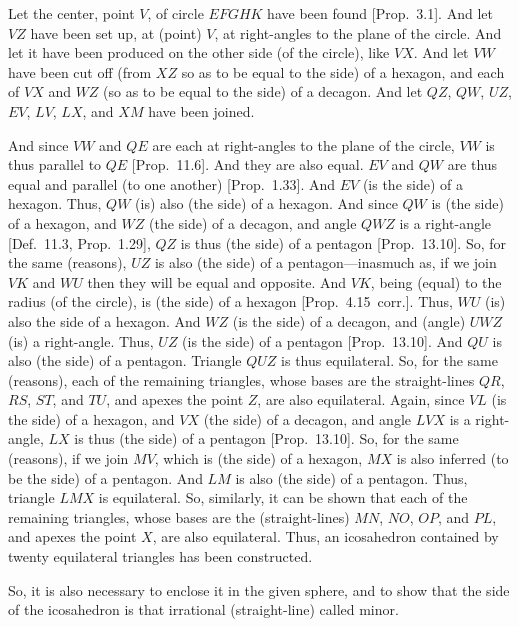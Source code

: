 \epsfysize=3.5in
\centerline{}

Let the center, point $V$, of circle $EFGHK$ have been found [Prop.~3.1]. 
And let $VZ$ have been set up, at (point) $V$,  at right-angles to the plane of the
circle. And let it have been produced on the other side (of the circle), 
like $VX$. And let $VW$ have been cut off 
(from $XZ$ so as to be equal to the side) of a hexagon, and each of $VX$ and 
$WZ$ (so as to be equal to the side) of a decagon. And let
$QZ$,  $QW$, $UZ$, $EV$, $LV$, $LX$, and
$XM$ have been joined.

And since $VW$ and $QE$ are each at right-angles to the plane of the
circle, $VW$ is thus parallel to $QE$ [Prop.~11.6].  And they are also
equal. $EV$ and $QW$ are thus equal and parallel (to one another) [Prop.~1.33]. And $EV$ (is the side) of a hexagon. Thus, $QW$
(is) also (the side) of a hexagon. And since $QW$ is (the side) of a hexagon, 
and $WZ$ (the side) of a decagon, and angle $QWZ$ is a right-angle
[Def.~11.3, Prop.~1.29], 
$QZ$ is thus (the side) of a pentagon [Prop.~13.10]. So, for the same
(reasons), $UZ$ is also (the side) of a pentagon---inasmuch as, if we join
$VK$ and $WU$ then they will be equal and opposite. 
And $VK$, being (equal)
to the radius (of the circle), is (the side) of a hexagon [Prop.~4.15~corr.].
Thus, $WU$ (is) also the side of a hexagon.
 And $WZ$
(is the side) of a decagon, and (angle) $UWZ$ (is) a right-angle. 
Thus, $UZ$ (is the side) of a pentagon [Prop.~13.10]. And $QU$ is
also (the side) of a pentagon. Triangle $QUZ$ is thus equilateral. So,
for the same (reasons), each of the remaining triangles, whose bases
are the straight-lines $QR$, $RS$, $ST$, and $TU$, and apexes the point
$Z$, are also equilateral. Again, since $VL$ (is the side) of a hexagon, and $VX$ (the side) of a decagon, and angle $LVX$ is a right-angle, 
$LX$ is thus (the side) of a pentagon [Prop.~13.10]. So, for the same
(reasons), if we join $MV$, which is (the side) of a hexagon, $MX$
is also inferred (to be the side) of a pentagon. And $LM$ is also (the side)
of a pentagon. Thus, triangle $LMX$ is equilateral. So, similarly,
it can be shown that each of the remaining triangles, whose bases
are the (straight-lines) $MN$, $NO$, $OP$, and $PL$, and apexes the
point $X$,  are also equilateral. Thus, an icosahedron contained by
twenty equilateral triangles has been constructed.

So, it is also necessary to enclose it in the given sphere, and to show
that the side of the icosahedron is that irrational (straight-line) called minor.


